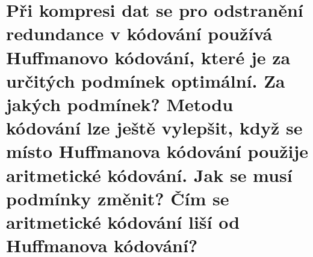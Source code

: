 \section{Při kompresi dat se pro odstranění redundance v kódování používá Huffmanovo kódování, které je za určitých 
podmínek optimální. Za jakých podmínek? Metodu kódování lze ještě vylepšit, když se místo Huffmanova kódování použije 
aritmetické kódování. Jak se musí podmínky změnit? Čím se aritmetické kódování liší od Huffmanova kódování?}